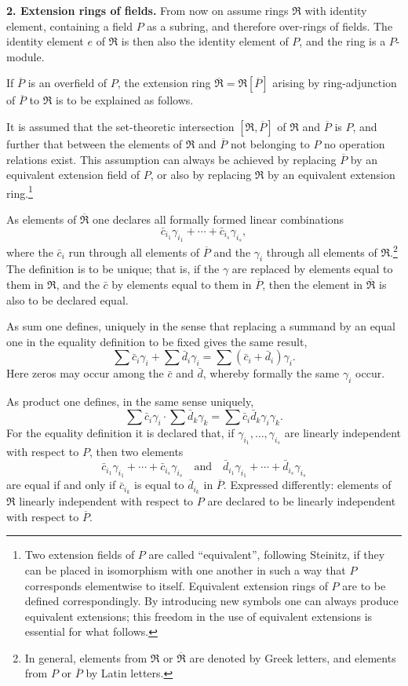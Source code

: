 \documentclass[11pt]{article}
\begin{document}
\textbf{2. Extension rings of fields.} From now on assume rings $\mathfrak R$ with identity element, containing a field $P$ as a subring, and therefore over-rings of fields. The identity element $e$ of $\mathfrak R$ is then also the identity element of $P$, and the ring is a $P$-module.

If $\overline P$ is an overfield of $P$, the extension ring $\overline{\mathfrak R}=\mathfrak R[\overline P]$ arising by ring-adjunction of $\overline P$ to $\mathfrak R$ is to be explained as follows.

It is assumed that the set-theoretic intersection $[\mathfrak R,\overline P]$ of $\mathfrak R$ and $\overline P$ is $P$, and further that between the elements of $\mathfrak R$ and $\overline P$ not belonging to $P$ no operation relations exist. This assumption can always be achieved by replacing $\overline P$ by an equivalent extension field of $P$, or also by replacing $\mathfrak R$ by an equivalent extension ring.\footnote{Two extension fields of $P$ are called ``equivalent'', following Steinitz, if they can be placed in isomorphism with one another in such a way that $P$ corresponds elementwise to itself. Equivalent extension rings of $P$ are to be defined correspondingly. By introducing new symbols one can always produce equivalent extensions; this freedom in the use of equivalent extensions is essential for what follows.}

As elements of $\overline{\mathfrak R}$ one declares all formally formed linear combinations
\[
   \bar c_{i_1}\gamma_{i_1}+\cdots+\bar c_{i_s}\gamma_{i_s},
\]
where the $\bar c_i$ run through all elements of $\overline P$ and the $\gamma_i$ through all elements of $\mathfrak R$.\footnote{In general, elements from $\mathfrak R$ or $\overline{\mathfrak R}$ are denoted by Greek letters, and elements from $P$ or $\overline P$ by Latin letters.} The definition is to be unique; that is, if the $\gamma$ are replaced by elements equal to them in $\mathfrak R$, and the $\bar c$ by elements equal to them in $\overline P$, then the element in $\overline{\mathfrak R}$ is also to be declared equal.

As sum one defines, uniquely in the sense that replacing a summand by an equal one in the equality definition to be fixed gives the same result,
\[
  \sum \bar c_i\gamma_i+\sum \bar d_i\gamma_i
  =\sum(\bar c_i+\bar d_i)\gamma_i .
\]
Here zeros may occur among the $\bar c$ and $\bar d$, whereby formally the same $\gamma_i$ occur.

As product one defines, in the same sense uniquely,
\[
  \sum \bar c_i\gamma_i\cdot \sum \bar d_k\gamma_k
  =\sum \bar c_i\bar d_k\gamma_i\gamma_k .
\]
For the equality definition it is declared that, if $\gamma_{i_1},\ldots,\gamma_{i_s}$ are linearly independent with respect to $P$, then two elements
\[
   \bar c_{i_1}\gamma_{i_1}+\cdots+\bar c_{i_s}\gamma_{i_s}
   \quad\text{and}\quad
   \bar d_{i_1}\gamma_{i_1}+\cdots+\bar d_{i_s}\gamma_{i_s}
\]
are equal if and only if $\bar c_{i_k}$ is equal to $\bar d_{i_k}$ in $\overline P$. Expressed differently: elements of $\mathfrak R$ linearly independent with respect to $P$ are declared to be linearly independent with respect to $\overline P$.
\end{document}
